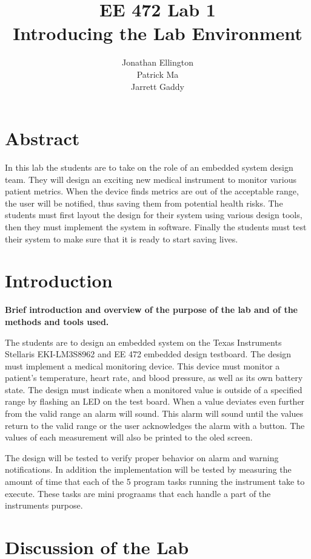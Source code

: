 \documentclass[12pt]{article} %
\title{\TitleFont EE 472 Lab 1 \\ Introducing the Lab Environment \vfill }
\author{\AuthorFont Jonathan Ellington \\ Patrick Ma \\ Jarrett Gaddy}
\date{}
\begin{document}
\maketitle
\thispagestyle{empty}
\pagebreak
\tableofcontents
\listoftables
\listoffigures
\thispagestyle{empty}
\pagebreak
\setcounter{page}{1}

\section{Abstract}
In this lab the students are to take on the role of an embedded system design team. They will design an exciting new medical instrument to monitor various patient metrics. When the device finds metrics are out of the acceptable range, the user will be notified, thus saving them from potential health risks. The students must first layout the design for their system using various design tools, then they must implement the system in software. Finally the students must test their system to make sure that it is ready to start saving lives.	

\section{Introduction}
\textbf{Brief introduction and overview of the purpose of the lab and of the methods and tools used.}

The students are to design an embedded system on the Texas Instruments Stellaris EKI-LM3S8962 and EE 472 embedded design testboard. The design must implement a medical monitoring device. This device must monitor a patient's temperature, heart rate, and blood pressure, as well as its own battery state. The design must indicate when a monitored value is outside of a specified range by flashing an LED on the test board. When a value deviates even further from the valid range an alarm will sound. This alarm will sound until the values return to the valid range or the user acknowledges the alarm with a button. The values of each measurement will also be printed to the oled screen.

The design will be tested to verify proper behavior on alarm and warning notifications. In addition the implementation will be tested by measuring the amount of time that each of the 5 program tasks running the instrument take to execute. These tasks are mini prograams that each handle a part of the instruments purpose.
 
\section{Discussion of the Lab}
\end{document}
